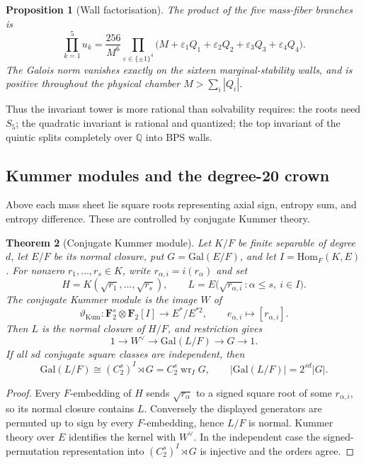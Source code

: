 \documentclass[11pt,a4paper]{article}
\newtheorem{theorem}{Theorem}[section]
\newtheorem{proposition}[theorem]{Proposition}
\theoremstyle{definition}
\theoremstyle{remark}
\newcommand{\Q}{\mathbb{Q}}
\newcommand{\FF}{\mathbf{F}}
\newcommand{\Gal}{\mathrm{Gal}}
\newcommand{\wrp}{\mathop{\mathrm{wr}}}
\begin{document}
\begin{proposition}[Wall factorisation]
\label{prop:walls}
The product of the five mass-fiber branches is
\[
\prod_{k=1}^{5}u_k
=
\frac{256}{M^6}
\prod_{\varepsilon\in\{\pm1\}^4}
\bigl(M+\varepsilon_1Q_1+\varepsilon_2Q_2+\varepsilon_3Q_3+\varepsilon_4Q_4\bigr).
\]
The Galois norm vanishes exactly on the sixteen marginal-stability walls, and
is positive throughout the physical chamber \(M>\sum_i|Q_i|\).
\end{proposition}

Thus the invariant tower is more rational than solvability requires: the roots
need \(S_5\); the quadratic invariant is rational and quantized; the top
invariant of the quintic splits completely over \(\Q\) into BPS walls.

\subsection{Kummer modules and the degree-20 crown}

Above each mass sheet lie square roots representing axial sign, entropy sum,
and entropy difference. These are controlled by conjugate Kummer theory.

\begin{theorem}[Conjugate Kummer module]
\label{thm:kummermodule}
Let \(K/F\) be finite separable of degree \(d\), let \(E/F\) be its normal
closure, put \(G=\Gal(E/F)\), and let \(I=\mathrm{Hom}_F(K,E)\). For nonzero
\(r_1,\ldots,r_s\in K\), write \(r_{\alpha,i}=i(r_\alpha)\) and set
\[
H=K(\sqrt{r_1},\ldots,\sqrt{r_s}),
\qquad
L=E\bigl(\sqrt{r_{\alpha,i}}:\alpha\le s,\ i\in I\bigr).
\]
The conjugate Kummer module is the image \(W\) of
\begin{equation}
\vartheta_{\mathrm{Kum}}:\FF_2^s\otimes\FF_2[I]\longrightarrow E^*/E^{*2},
\qquad
e_{\alpha,i}\longmapsto[r_{\alpha,i}].
\label{eq:kummermap}
\end{equation}
Then \(L\) is the normal closure of \(H/F\), and restriction gives
\[
1\longrightarrow W^\vee\longrightarrow\Gal(L/F)\longrightarrow G\longrightarrow1.
\]
If all \(sd\) conjugate square classes are independent, then
\[
\Gal(L/F)\cong(C_2^s)^I\rtimes G=C_2^s\wrp_I G,
\qquad
|\Gal(L/F)|=2^{sd}|G|.
\]
\end{theorem}

\begin{proof}
Every \(F\)-embedding of \(H\) sends \(\sqrt{r_\alpha}\) to a signed square root of
some \(r_{\alpha,i}\), so its normal closure contains \(L\). Conversely the
displayed generators are permuted up to sign by every \(F\)-embedding, hence
\(L/F\) is normal. Kummer theory over \(E\) identifies the kernel with
\(W^\vee\). In the independent case the signed-permutation representation into
\((C_2^s)^I\rtimes G\) is injective and the orders agree.
\end{proof}
\end{document}
